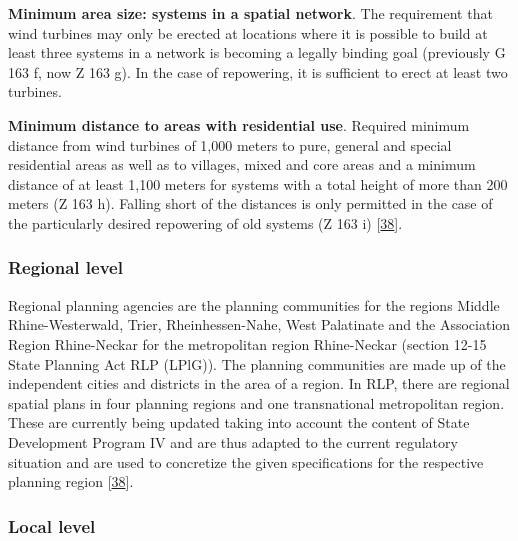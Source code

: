 \documentclass[a4paper,11pt]{article}
\begin{document}
\textbf{Minimum area size: systems in a spatial network}. The requirement that wind turbines may only be erected at locations where it is possible to build at least three systems in a network is becoming a legally binding goal (previously G 163 f, now Z 163 g). In the case of repowering, it is sufficient to erect at least two turbines.

\textbf{Minimum distance to areas with residential use}. Required minimum distance from wind turbines of 1,000 meters to pure, general and special residential areas as well as to villages, mixed and core areas and a minimum distance of at least 1,100 meters for systems with a total height of more than 200 meters (Z 163 h). Falling short of the distances is only permitted in the case of the particularly desired repowering of old systems (Z 163 i) {[}\protect\hyperlink{ref-MinisteriumdesInnernundfurSport.2017}{38}{]}.

\hypertarget{regional-level}{%
\subsubsection{Regional level}\label{regional-level}}

Regional planning agencies are the planning communities for the regions Middle Rhine-Westerwald, Trier, Rheinhessen-Nahe, West Palatinate and the Association Region Rhine-Neckar for the metropolitan region Rhine-Neckar (section 12-15 State Planning Act RLP (LPlG)). The planning communities are made up of the independent cities and districts in the area of a region. In RLP, there are regional spatial plans in four planning regions and one transnational metropolitan region. These are currently being updated taking into account the content of State Development Program IV and are thus adapted to the current regulatory situation and are used to concretize the given specifications for the respective planning region {[}\protect\hyperlink{ref-MinisteriumdesInnernundfurSport.2017}{38}{]}.

\hypertarget{local-level}{%
\subsubsection{Local level}\label{local-level}}
\end{document}
